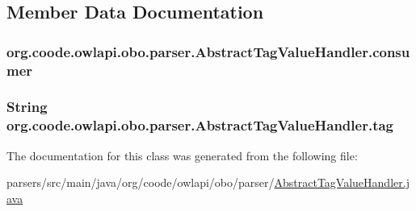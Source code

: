 \subsection{Member Data Documentation}
\hypertarget{classorg_1_1coode_1_1owlapi_1_1obo_1_1parser_1_1_abstract_tag_value_handler_ab27f1ff22d15640c5f81585f18265137}{
\subsubsection[{consumer}]{ org.\-coode.\-owlapi.\-obo.\-parser.\-Abstract\-Tag\-Value\-Handler.\-consumer\hspace{0.3cm}{\ttfamily [private]}}}\label{classorg_1_1coode_1_1owlapi_1_1obo_1_1parser_1_1_abstract_tag_value_handler_ab27f1ff22d15640c5f81585f18265137}
\hypertarget{classorg_1_1coode_1_1owlapi_1_1obo_1_1parser_1_1_abstract_tag_value_handler_af9d0866392b74b57ec524c6ae0f6e7be}{
\subsubsection[{tag}]{\setlength{\rightskip}{0pt plus 5cm}String org.\-coode.\-owlapi.\-obo.\-parser.\-Abstract\-Tag\-Value\-Handler.\-tag\hspace{0.3cm}{\ttfamily [private]}}}\label{classorg_1_1coode_1_1owlapi_1_1obo_1_1parser_1_1_abstract_tag_value_handler_af9d0866392b74b57ec524c6ae0f6e7be}


The documentation for this class was generated from the following file\-:\begin{DoxyCompactItemize}
\item 
parsers/src/main/java/org/coode/owlapi/obo/parser/\hyperlink{_abstract_tag_value_handler_8java}{Abstract\-Tag\-Value\-Handler.\-java}\end{DoxyCompactItemize}
